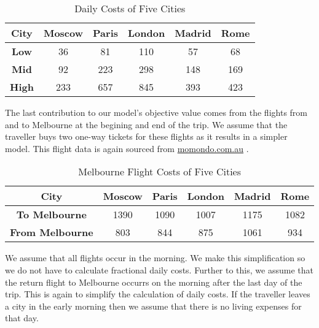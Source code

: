 \documentclass[12pt]{article}
\begin{document}
\begin{table}[h!]
\centering
\vspace{1mm}
\begin{tabular}{c|c|c|c|c|c}
\hline
\rule{0pt}{2ex} \textbf{City}  & \textbf{Moscow} & \textbf{Paris} & \textbf{London} & \textbf{Madrid} & \textbf{Rome} \\
\hline
\rule{0pt}{2ex}\textbf{Low} & 36 & 81 & 110 & 57 & 68 \\
\textbf{Mid} & 92 & 223 & 298 & 148 & 169 \\
\textbf{High} & 233 & 657 & 845 & 393 & 423 \\\hline
\end{tabular}
\caption{Daily Costs of Five Cities}
\end{table}

The last contribution to our model's objective value comes from the flights from and to Melbourne at the begining and end of the trip. We assume that the traveller buys two one-way tickets for these flights as it results in a simpler model.  This flight data is again sourced from \url{momondo.com.au} \cite{momondo}.

\begin{table}[h!]
\centering
\vspace{1mm}
\begin{tabular}{c|c|c|c|c|c}
\hline
\rule{0pt}{2ex} \textbf{City} & \textbf{Moscow} & \textbf{Paris }& \textbf{London} & \textbf{Madrid} & \textbf{Rome} \\
\hline
\rule{0pt}{2ex} \textbf{To Melbourne} & 1390 & 1090 & 1007 & 1175 & 1082 \\
\rule{0pt}{2ex} \textbf{From Melbourne} & 803 & 844 & 875 & 1061 & 934 \\\hline
\end{tabular}
\caption{Melbourne Flight Costs of Five Cities}
\end{table}

We assume that all flights occur in the morning. We make this simplification so we do not have to calculate fractional daily costs. Further to this, we assume that the return flight to Melbourne occurrs on the morning after the last day of the trip. This is again to simplify the calculation of daily costs. If the traveller leaves a city in the early morning then we assume that there is no living expenses for that day.
\end{document}
